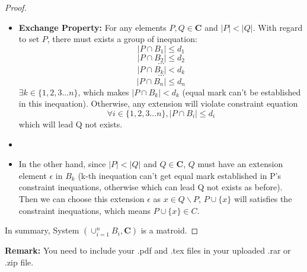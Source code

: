 \documentclass[12pt,a4paper]{article}
\theoremstyle{definition}
\begin{document}
\begin{enumerate}
\begin{enumerate}
\begin{proof}
\begin{itemize}
           \item \textbf{Exchange Property:} For any elements $P,Q \in \mathbf{C}$ and $|P| < |Q|$. With regard to set $P$, there must exists a group of inequation:
           $$|P\cap B_{1}|\leq d_{1}$$
           $$|P\cap B_{2}|\leq d_{2}$$
           $$\cdots$$
           $$|P\cap B_{k}|< d_{k}$$
           $$\cdots$$
           $$|P\cap B_{n}|\leq d_{n}$$
           $\exists k\in \{1,2,3 ... n\}$, which makes $|P\cap B_{k}|< d_{k}$ (equal mark can't be established in this inequation). Otherwise, any extension will violate constraint equation $$\forall i\in \{1,2,3 ... n\},  |P\cap B_{i}|\leq d_{i}$$ which will lead Q not exists.\item []\item []
           In the other hand, since $|P| < |Q|$ and $Q\in \mathbf{C}$, $Q$ must have an extension element $\epsilon$ in $B_k$ (k-th inequation can't get equal mark established in P's constraint inequations, otherwise which can lead Q not exists as before). Then we can choose this extension $\epsilon$ as $x \in Q\backslash P$, $P \cup \{x\}$ will satisfies the constraint inequations, which means $P \cup \{x\} \in C$.
       \end{itemize}
       In summary, System $(\cup^{n}_{i=1} B_i,\mathbf{C})$ is a matroid.
    \end{proof}


\end{enumerate}
  

    

\end{enumerate}

\vspace{20pt}

\textbf{Remark:} You need to include your .pdf and .tex files in your uploaded .rar or .zip file.

\end{document}
